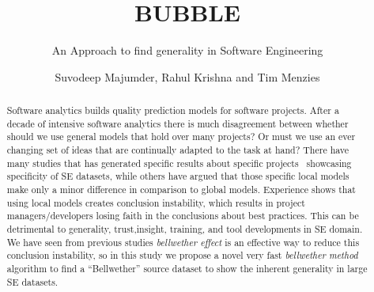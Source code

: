 \documentclass[sigconf,review]{acmart}
\theoremstyle{break}
\begin{document}



\title{BUBBLE}
\subtitle{An Approach to find generality in Software Engineering}

\author{Suvodeep Majumder, Rahul Krishna and Tim Menzies}


\begin{abstract}
Software analytics builds quality prediction models for software projects. After a decade of intensive software analytics there is much disagreement between whether should we use general models that hold over many projects? Or must we use an ever changing set of ideas that are continually adapted to the task at hand? There have many studies that has generated specific results about specific projects~\cite{Bird:2015, menzies2013software} showcasing specificity of SE datasets, while others have argued that those specific local models make only a minor difference in comparison to global models. Experience shows that using local models creates conclusion instability, which results in project managers/developers losing faith in the conclusions about best practices. This can be detrimental to generality, trust,insight, training, and tool developments in SE domain. We have seen from previous studies \textit{bellwether effect}  is an effective way to reduce this conclusion instability, so in this study we propose a novel very fast \textit{bellwether method} algorithm to find a ``Bellwether'' source dataset to show the inherent generality in large SE datasets.

\end{abstract}


\end{document}
